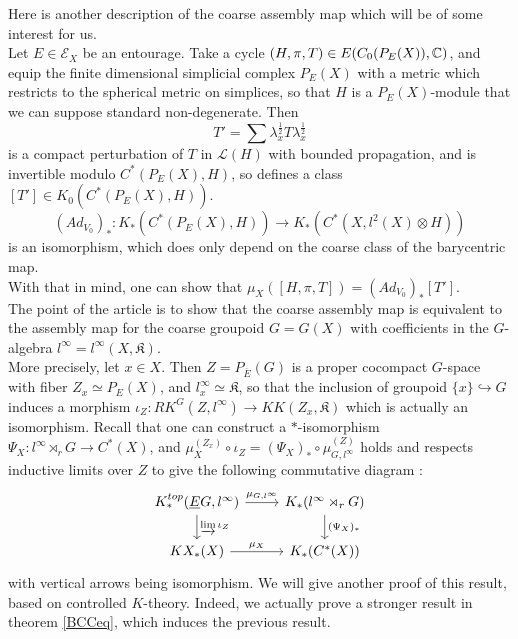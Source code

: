 Here is another description of the coarse assembly map which will be of some interest for us.\\

Let $E\in \mathcal E_X$ be an entourage. Take a cycle $(H,\pi, T)\in E(C_0(P_E(X)), \mathbb C)$, and equip the finite dimensional simplicial complex $P_E(X)$ with a metric which restricts to the spherical metric on simplices, so that $H$ is a $P_E(X)$-module that we can suppose standard non-degenerate. Then 
\[T'=\sum \lambda_x^{\frac{1}{2}} T \lambda_x^{\frac{1}{2}} \] 
is a compact perturbation of $T$ in $\mathcal L(H)$ with bounded propagation, and is invertible modulo $C^*(P_E(X),H)$, so defines a class $[T']\in K_0(C^*(P_E(X),H))$. 
\[(Ad_{V_0})_* : K_*(C^*(P_E(X),H))\rightarrow K_*(C^*(X,l^2(X)\otimes H))\]
is an isomorphism, which does only depend on the coarse class of the barycentric map.\\

With that in mind, one can show that $\mu_{X}([H,\pi,T])=(Ad_{V_0})_*[T']$.\\

The point of the article \cite{SkTuYu} is to show that the coarse assembly map is equivalent to the assembly map for the coarse groupoid $G=G(X)$ with coefficients in the $G$-algebra $l^\infty=l^\infty(X,\mathfrak K)$. \\

More precisely, let $x\in X$. Then $Z=P_{\overline E}(G)$ is a proper cocompact $G$-space with fiber $Z_x\simeq P_E(X)$, and $l^\infty_x \simeq \mathfrak K$, so that the inclusion of groupoid $\{x\}\hookrightarrow G $ induces a morphism $\iota_Z : RK^G(Z,l^\infty)\rightarrow KK(Z_x,\mathfrak K)$ which is actually an isomorphism. Recall that one can construct a $*$-isomorphism $\Psi_X: l^\infty \rtimes_r G\rightarrow C^*(X)$, and $\mu_X^{(Z_x)}\circ \iota_Z = (\Psi_X)_*\circ \mu_{G,l^\infty}^{(Z)}$ holds and respects inductive limits over $Z$ to give the following commutative diagram :
\[\begin{tikzcd}
K_*^{top}(\underline E G, l^\infty) \arrow{r}{\mu_{G,l^\infty}}\arrow{d}{\varinjlim \iota_Z} & K_*(l^\infty\rtimes_r G)\arrow{d}{(\Psi_X)_*} \\
KX_*(X)\arrow{r}{\mu_X} & K_*(C^*(X))
\end{tikzcd}\]  
with vertical arrows being isomorphism. We will give another proof of this result, based on controlled $K$-theory. Indeed, we actually prove a stronger result in theorem \ref{BCCeq}, which induces the previous result. \\

